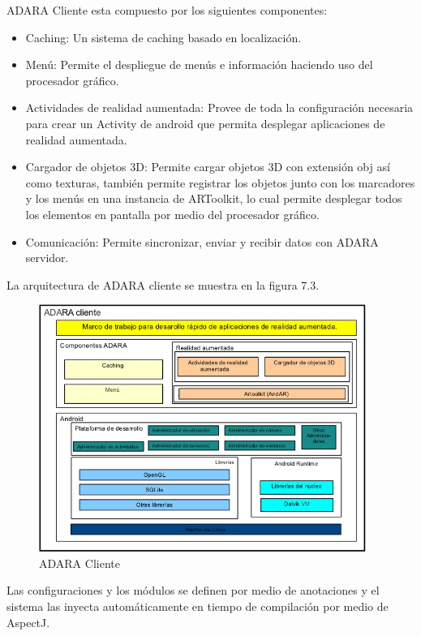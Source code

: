 \documentclass[12pt,a4paper,spanish,openany]{book}
\begin{document}
ADARA Cliente esta compuesto por los siguientes componentes:
\begin{itemize}
  \item Caching: Un sistema de caching basado en localización.
  \item Menú: Permite el despliegue de menús e información haciendo uso del
  procesador gráfico.
  \item Actividades de realidad aumentada: Provee de toda la configuración
  necesaria para crear un Activity de android que permita desplegar aplicaciones
  de realidad aumentada.
  \item Cargador de objetos 3D: Permite cargar objetos 3D con extensión obj así
  como texturas, también permite registrar los objetos junto con los marcadores
  y los menús en una instancia de ARToolkit, lo cual permite desplegar todos los
  elementos en pantalla por medio del procesador gráfico.
  \item Comunicación: Permite sincronizar, enviar y recibir datos con ADARA
  servidor.
\end{itemize}

La arquitectura de ADARA cliente se muestra en la figura 7.3.

\begin{figure}[ht]
\begin{center}
 \includegraphics[width=0.95\textwidth]{./img/ADARACliente.jpg}
\caption{ADARA Cliente}
\end{center}
\end{figure}

Las configuraciones y los módulos se definen por medio de
anotaciones y el sistema las inyecta automáticamente en tiempo de compilación
por medio de AspectJ.
\end{document}
